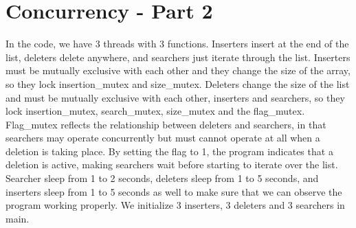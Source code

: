 \documentclass[onecolumn, oneside, letterpaper, draftclsnofoot, 10pt, compsoc]{IEEEtran}
\begin{document}
\section{Concurrency - Part 2}
In the code, we have 3 threads with 3 functions. Inserters insert at the end of the list, deleters delete anywhere, and searchers just iterate through the list. Inserters must be mutually exclusive with each other and they change the size of the array, so they lock insertion\_mutex and size\_mutex. Deleters change the size of the list and must be mutually exclusive with each other, inserters and searchers, so they lock insertion\_mutex, search\_mutex, size\_mutex and the flag\_mutex. Flag\_mutex reflects the relationship between deleters and searchers, in that searchers may operate concurrently but must cannot operate at all when a deletion is taking place. By setting the flag to 1, the program indicates that a deletion is active, making searchers wait before starting to iterate over the list. Searcher sleep from 1 to 2 seconds, deleters sleep from 1 to 5 seconds, and inserters sleep from 1 to 5 seconds as well to make sure that we can observe the program working properly. We initialize 3 inserters, 3 deleters and 3 searchers in main.

%
%
\end{document}
